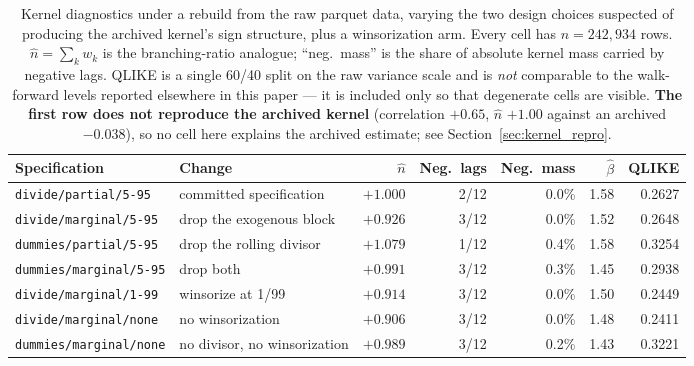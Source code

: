 \begin{table}[H]
\centering
\caption{Kernel diagnostics under a rebuild from the raw parquet data,
varying the two design choices suspected of producing the archived kernel's
sign structure, plus a winsorization arm. Every cell has $n = 242{,}934$
rows. $\hat n = \sum_k w_k$ is the branching-ratio analogue; ``neg.\ mass''
is the share of absolute kernel mass carried by negative lags. QLIKE is a
single 60/40 split on the raw variance scale and is \emph{not} comparable to
the walk-forward levels reported elsewhere in this paper --- it is included
only so that degenerate cells are visible. \textbf{The first row does not
reproduce the archived kernel} (correlation $+0.65$, $\hat n$ $+1.00$ against
an archived $-0.038$), so no cell here explains the archived estimate; see
Section~\ref{sec:kernel_repro}.}
\label{tab:kernel_experiments}
\begin{tabular}{llrrrrr}
\toprule
Specification & Change & $\hat n$ & Neg.\ lags & Neg.\ mass & $\hat\beta$ & QLIKE \\
\midrule
\texttt{divide/partial/5-95} & committed specification & $+1.000$ & 2/12 & 0.0\% & 1.58 & 0.2627 \\
\texttt{divide/marginal/5-95} & drop the exogenous block & $+0.926$ & 3/12 & 0.0\% & 1.52 & 0.2648 \\
\texttt{dummies/partial/5-95} & drop the rolling divisor & $+1.079$ & 1/12 & 0.4\% & 1.58 & 0.3254 \\
\texttt{dummies/marginal/5-95} & drop both & $+0.991$ & 3/12 & 0.3\% & 1.45 & 0.2938 \\
\texttt{divide/marginal/1-99} & winsorize at 1/99 & $+0.914$ & 3/12 & 0.0\% & 1.50 & 0.2449 \\
\texttt{divide/marginal/none} & no winsorization & $+0.906$ & 3/12 & 0.0\% & 1.48 & 0.2411 \\
\texttt{dummies/marginal/none} & no divisor, no winsorization & $+0.989$ & 3/12 & 0.2\% & 1.43 & 0.3221 \\
\bottomrule
\end{tabular}
\end{table}
